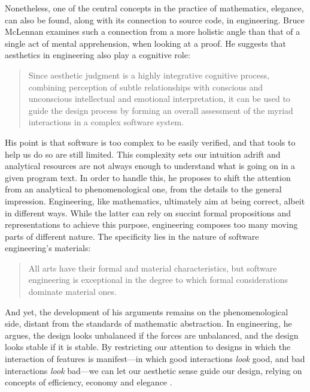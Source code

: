 Nonetheless, one of the central concepts in the practice of mathematics, elegance, can also be found, along with its connection to source code, in engineering. Bruce McLennan examines such a connection from a more holistic angle than that of a single act of mental apprehension, when looking at a proof. He suggests that aesthetics in engineering also play a cognitive role:

\begin{quote}
  Since aesthetic judgment is a highly integrative cognitive process, combining perception of subtle relationships with conscious and unconscious intellectual and emotional interpretation, it can be used to guide the design process by forming an overall assessment of the myriad interactions in a complex software system. \citep{schummer_aesthetic_2009}
\end{quote}

His point is that software is too complex to be easily verified, and that tools to help us do so are still limited. This complexity sets our intuition adrift and analytical resources are not always enough to understand what is going on in a given program text. In order to handle this, he proposes to shift the attention from an analytical to phenomenological one, from the details to the general impression. Engineering, like mathematics, ultimately aim at being correct, albeit in different ways. While the latter can rely on succint formal propositions and representations to achieve this purpose, engineering composes too many moving parts of different nature. The specificity lies in the nature of software engineering's materials:

\begin{quote}
  All arts have their formal and material characteristics, but software engineering is exceptional in the degree to which formal considerations dominate material ones. \citep{schummer_aesthetic_2009}
\end{quote}

And yet, the development of his arguments remains on the phenomenological side, distant from the standards of mathematic abstraction. In engineering, he argues, the design looks unbalanced if the forces are unbalanced, and the design looks stable if it is stable.  By restricting our attention to designs in which the interaction of features is manifest—in which good interactions \emph{look} good, and bad interactions \emph{look} bad—we can let our aesthetic sense guide our design, relying on concepts of efficiency, economy and elegance \citep{mclennan_who_1997}.

